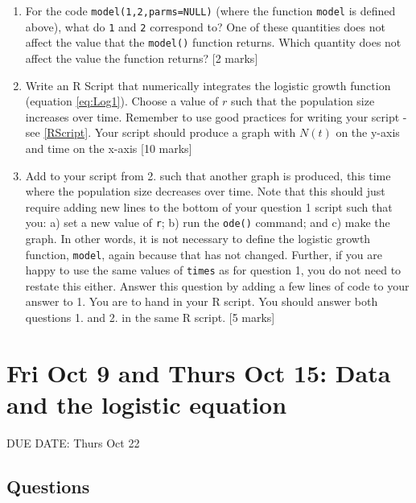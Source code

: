 \documentclass[]{book}
\begin{document}
\begin{enumerate}
\def\labelenumi{\arabic{enumi}.}
\item
  For the code \texttt{model(1,2,parms=NULL)} (where the function
  \texttt{model} is defined above), what do \texttt{1} and \texttt{2}
  correspond to? One of these quantities does not affect the value that
  the \texttt{model()} function returns. Which quantity does not affect
  the value the function returns? {[}2 marks{]}
\item
  Write an R Script that numerically integrates the logistic growth
  function (equation \eqref{eq:Log1}). Choose a value of \(r\) such that
  the population size increases over time. Remember to use good
  practices for writing your script - see \ref{RScript}. Your script
  should produce a graph with \(N(t)\) on the y-axis and time on the
  x-axis {[}10 marks{]}
\item
  Add to your script from 2. such that another graph is produced, this
  time where the population size decreases over time. Note that this
  should just require adding new lines to the bottom of your question 1
  script such that you: a) set a new value of \texttt{r}; b) run the
  \texttt{ode()} command; and c) make the graph. In other words, it is
  not necessary to define the logistic growth function, \texttt{model},
  again because that has not changed. Further, if you are happy to use
  the same values of \texttt{times} as for question 1, you do not need
  to restate this either. Answer this question by adding a few lines of
  code to your answer to 1. You are to hand in your R script. You should
  answer both questions 1. and 2. in the same R script. {[}5 marks{]}
\end{enumerate}

\chapter{Fri Oct 9 and Thurs Oct 15: Data and the logistic
equation}\label{fri-oct-9-and-thurs-oct-15-data-and-the-logistic-equation}

DUE DATE: Thurs Oct 22

\section{Questions}\label{questions}
\end{document}
